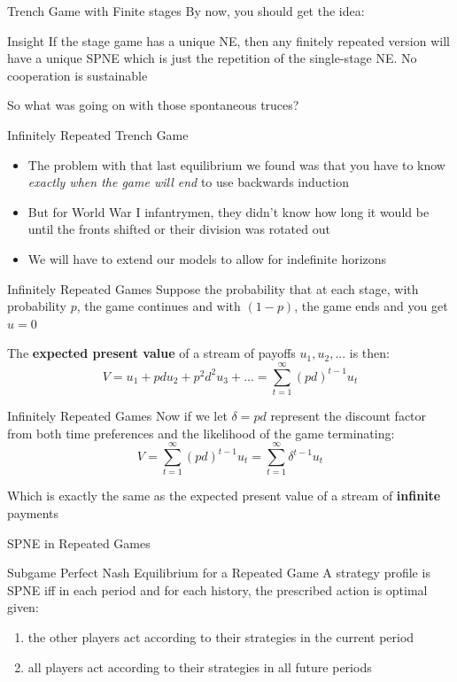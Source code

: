 \begin{frame}{Trench Game with Finite stages}
  By now, you should get the idea:
  \begin{block}{Insight}
    If the stage game has a unique NE, then any finitely repeated version will have a unique SPNE which is just the repetition of the single-stage NE. No cooperation is sustainable 
  \end{block}

  So what was going on with those spontaneous truces?
\end{frame}

\begin{frame}{Infinitely Repeated Trench Game}
  \begin{itemize}
    \item The problem with that last equilibrium we found was that you have to know \textit{exactly when the game will end} to use backwards induction 
    \item But for World War I infantrymen, they didn't know how long it would be until the fronts shifted or their division was rotated out
    \item We will have to extend our models to allow for \alert{indefinite horizons}
  \end{itemize} 
\end{frame}

\begin{frame}{Infinitely Repeated Games}
  Suppose the probability that at each stage, with probability $p$, the game continues and with $(1-p)$, the game ends and you get $u=0$

  The \textbf{expected present value} of a stream of payoffs $u_1, u_2, ...$ is then:
  $$ V = u_1 + p d u_2 + p^2 d^2 u_3 + ... = \sum_{t=1}^{\infty}(pd)^{t-1}u_t $$
\end{frame}

\begin{frame}{Infinitely Repeated Games}
  Now if we let $\delta = pd$ represent the discount factor from both time preferences and the likelihood of the game terminating:
  $$ V = \sum_{t=1}^{\infty}(pd)^{t-1}u_t = \sum_{t=1}^{\infty}\delta^{t-1}u_t $$

  Which is exactly the same as the expected present value of a stream of \textbf{infinite} payments
\end{frame}

\begin{frame}{SPNE in Repeated Games}
  \begin{block}{Subgame Perfect Nash Equilibrium for a Repeated Game}
    A strategy profile is SPNE iff in each period and for each history, the prescribed action is optimal given:
    \begin{enumerate}
      \item the other players act according to their strategies in the current period
      \item all players act according to their strategies in all future periods
    \end{enumerate}
  \end{block} 
\end{frame}

